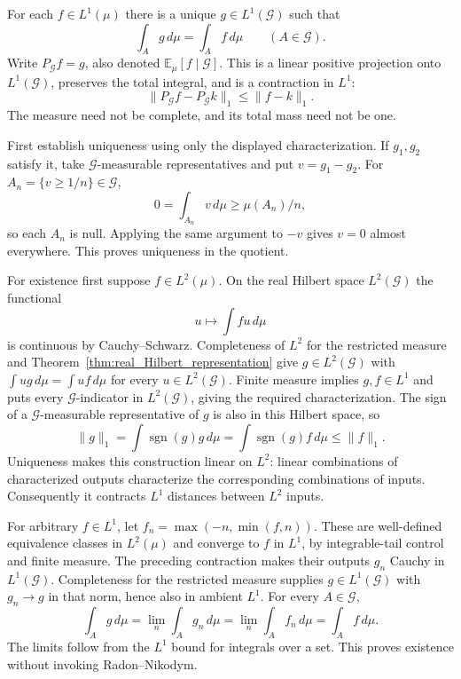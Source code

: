 \begin{theorem}
\label{thm:conditional_expectation_finite}
For each $f\in L^1(\mu)$ there is a unique $g\in L^1(\mathcal G)$
such that
\[
\int_A g\,d\mu=\int_A f\,d\mu\qquad(A\in\mathcal G).
\]
Write $P_{\mathcal G}f=g$, also denoted
$\mathbb E_\mu[f\mid\mathcal G]$. This is a linear positive
projection onto $L^1(\mathcal G)$, preserves the total integral, and
is a contraction in $L^1$:
\[
\|P_{\mathcal G}f-P_{\mathcal G}k\|_1\leq\|f-k\|_1.
\]
The measure need not be complete, and its total mass need not be one.
\end{theorem}
\Proof
First establish uniqueness using only the displayed characterization.
If $g_1,g_2$ satisfy it, take $\mathcal G$-measurable representatives
and put $v=g_1-g_2$. For
$A_n=\{v\geq1/n\}\in\mathcal G$,
\[
0=\int_{A_n}v\,d\mu\geq\mu(A_n)/n,
\]
so each $A_n$ is null. Applying the same argument to $-v$ gives
$v=0$ almost everywhere. This proves uniqueness in the quotient.

For existence first suppose $f\in L^2(\mu)$. On the real Hilbert
space $L^2(\mathcal G)$ the functional
\[
u\longmapsto\int fu\,d\mu
\]
is continuous by Cauchy--Schwarz. Completeness of $L^2$ for the
restricted measure and Theorem~\ref{thm:real_Hilbert_representation}
give $g\in L^2(\mathcal G)$ with
$\int ug\,d\mu=\int uf\,d\mu$ for every $u\in L^2(\mathcal G)$.
Finite measure implies $g,f\in L^1$ and puts every
$\mathcal G$-indicator in $L^2(\mathcal G)$, giving the required
characterization. The sign of a $\mathcal G$-measurable representative
of $g$ is also in this Hilbert space, so
\[
\|g\|_1=\int\operatorname{sgn}(g)g\,d\mu
 =\int\operatorname{sgn}(g)f\,d\mu\leq\|f\|_1.
\]
Uniqueness makes this construction linear on $L^2$: linear combinations
of characterized outputs characterize the corresponding combinations
of inputs. Consequently it contracts $L^1$ distances between $L^2$
inputs.

For arbitrary $f\in L^1$, let
$f_n=\max(-n,\min(f,n))$. These are well-defined equivalence classes
in $L^2(\mu)$ and converge to $f$ in $L^1$, by integrable-tail
control and finite measure. The preceding contraction makes their
outputs $g_n$ Cauchy in $L^1(\mathcal G)$. Completeness for the
restricted measure supplies $g\in L^1(\mathcal G)$ with
$g_n\to g$ in that norm, hence also in ambient $L^1$. For every
$A\in\mathcal G$,
\[
\int_A g\,d\mu
 =\lim_n\int_A g_n\,d\mu
 =\lim_n\int_A f_n\,d\mu
 =\int_A f\,d\mu.
\]
The limits follow from the $L^1$ bound for integrals over a set.
This proves existence without invoking Radon--Nikodym.

